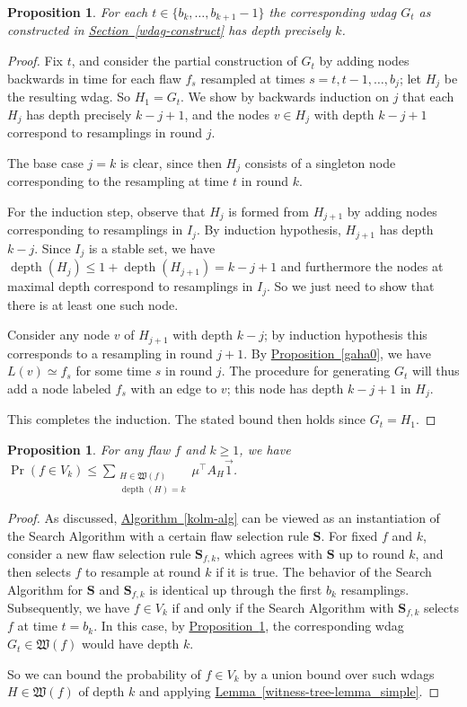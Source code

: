 \documentclass[11pt]{article}
\newcommand{\expref}[2]{\texorpdfstring{\hyperref[#2]{#1~\ref{#2}}}{#1~\ref{#2}}}
\newtheorem{proposition}[theorem]{Proposition}
\DeclareMathOperator{\depth}{depth}
\begin{document}
\begin{proposition}
\label{gaha1}
For each $t \in \{ b_k, \dots, b_{k+1} - 1 \}$ the corresponding wdag $G_t$ as constructed in \expref{Section}{wdag-construct} has depth precisely $k$.
\end{proposition}
 \begin{proof}
 Fix $t$, and consider the partial construction of $G_t$ by adding nodes backwards in time for each flaw $f_s$ resampled at times $s = t, t-1, \dots, b_j$; let $H_j$ be the resulting wdag. So $H_1 = G_t$. We show by backwards induction on $j$ that each $H_j$ has depth precisely $k - j + 1$, and the nodes $v \in H_j$ with depth $k - j + 1$ correspond to resamplings in round $j$. 
 
 The base case $j = k$ is clear, since then $H_j$ consists of a singleton node corresponding to the resampling at time $t$ in round $k$.

For the induction step,  observe that $H_j$ is formed from $H_{j+1}$ by adding nodes corresponding to resamplings in $I_j$. By induction hypothesis, $H_{j+1}$ has depth $k-j$. Since $I_j$ is a stable set, we have $\depth(H_{j}) \leq 1 + \depth(H_{j+1}) =  k-j+1$ and furthermore the nodes at maximal depth correspond to resamplings in $I_j$. So we just need to show that there is at least one such node.

Consider any node $v$ of $H_{j+1}$ with depth $k-j$; by induction hypothesis this corresponds to a resampling in round $j+1$. By \expref{Proposition}{gaha0}, we have $L(v) \simeq f_{s}$ for some time $s$ in round $j$. The procedure for generating $G_t$ will thus add a node labeled $f_s$ with an edge to $v$; this node has depth $k-j+1$ in $H_j$. 

This completes the induction.  The stated bound then holds since $G_t = H_1$.
\end{proof}

\begin{proposition}
\label{gaha11}
For any flaw $f$ and $k \geq 1$, we have $\Pr( f \in V_k) \leq \sum_{\substack{H \in \mathfrak W(f) \\ \depth(H) = k}} \mu^{\top} A_H \vec 1$.
\end{proposition}
\begin{proof}
As discussed, \expref{Algorithm}{kolm-alg} can be viewed as an instantiation of the Search Algorithm with a certain flaw selection rule $\mathbf S$. For fixed $f$ and $k$, consider a new flaw selection rule $\mathbf S_{f,k}$, which agrees with $\mathbf S$ up to round $k$, and then selects $f$ to resample at round $k$ if it is true. The behavior of the Search Algorithm for $\mathbf S$ and $\mathbf S_{f,k}$ is identical up through the first $b_{k}$ resamplings. Subsequently, we have $f \in V_k$ if and only if the Search Algorithm with $\mathbf S_{f,k}$ selects $f$ at time $t = b_{k}$. In this case, by \expref{Proposition}{gaha1}, the corresponding wdag $G_t \in \mathfrak W(f)$ would have depth $k$.

 So we can bound the probability of $f \in V_k$ by a union bound over such wdags $H \in \mathfrak W(f)$ of depth $k$ and applying \expref{Lemma}{witness-tree-lemma_simple}.
\end{proof}
\end{document}
